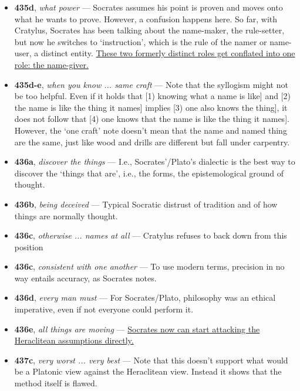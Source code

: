 \documentclass[12pt]{article}
\begin{document}
\begin{itemize}

\item \textbf{435d}, \textit{what power} --- Socrates assumes his point is proven and moves onto what he wants to prove. However, a confusion happens here. So far, with Cratylus, Socrates has been talking about the name-maker, the rule-setter, but now he switches to `instruction', which is the rule of the namer or name-user, a distinct entity. \ul{These two formerly distinct roles get conflated into one role: the name-giver.}

\item \textbf{435d-e}, \textit{when you know ... same craft} --- Note that the syllogism might not be too helpful. Even if it holds that [1) knowing what a name is like] and [2) the name is like the thing it names] implies [3) one also knows the thing], it does not follow that [4) one knows that the name is like the thing it names]. However, the `one craft' note doesn't mean that the name and named thing are the same, just like wood and drills are different but fall under carpentry.

\item \textbf{436a}, \textit{discover the things} --- I.e., Socrates'/Plato's dialectic is the best way to discover the `things that are', i.e., the forms, the epistemological ground of thought.

\item \textbf{436b}, \textit{being deceived} --- Typical Socratic distrust of tradition and of how things are normally thought.

\item \textbf{436c}, \textit{otherwise ... names at all} --- Cratylus refuses to back down from this position

\item \textbf{436c}, \textit{consistent with one another} --- To use modern terms, precision in no way entails accuracy, as Socrates notes.

\item \textbf{436d}, \textit{every man must} --- For Socrates/Plato, philosophy was an ethical imperative, even if not everyone could perform it.

\item \textbf{436e}, \textit{all things are moving} --- \ul{Socrates now can start attacking the Heraclitean assumptions directly.}

\item \textbf{437c}, \textit{very worst ... very best} --- Note that this doesn't support what would be a Platonic view against the Heraclitean view. Instead it shows that the method itself is flawed.


\end{itemize}
\end{document}
